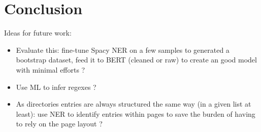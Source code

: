 \section{Conclusion}

Ideas for future work:
\begin{itemize}
    \item Evaluate this: fine-tune Spacy NER on a few samples to generated a bootstrap dataset, feed it to BERT (cleaned or raw) to create an good model with minimal efforts ?
    \item Use ML to infer regexes ?
    \item As directories entries are always structured the same way (in a given list at least): use NER to identify entries within pages to save the burden of having to rely on the page layout ?
\end{itemize}